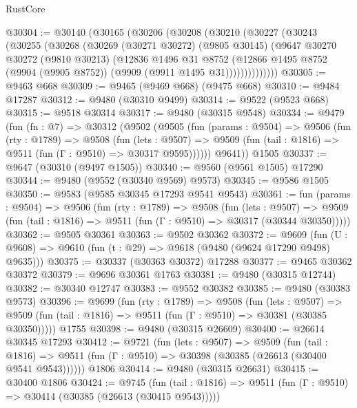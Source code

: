 \begin{lexlean}{RustCore}
\begin{coremodule}
@30304 := @30140
    (@30165
      (@30206
        (@30208
          (@30210
            (@30227
              (@30243
                (@30255
                  (@30268
                    (@30269
                      (@30271 @30272)
                      (@9805 @30145)
                      (@9647
                        @30270
                        @30272
                        (@9810 @30213)
                        (@12836
                          @1496
                          @31
                          @8752
                          (@12866
                            @1495
                            @8752
                            (@9904 (@9905 @8752))
                            (@9909 (@9911 @1495 @31))))))))))))))
@30305 := @9463 @668
@30309 := @9465 (@9469 @668) (@9475 @668)
@30310 := @9484 @17287
@30312 := @9480 (@30310 @9499)
@30314 := @9522 (@9523 @668)
@30315 := @9518 @30314
@30317 := @9480 (@30315 @9548)
@30334 := @9479
    (fun (fn : @7) =>
    @30312
      (@9502
        (@9505
          (fun (params : @9504) =>
          @9506
            (fun (rty : @1789) =>
            @9508
              (fun (lets : @9507) =>
              @9509 (fun (tail : @1816) => @9511 (fun (Γ : @9510) => @30317 @9595))))))
        @9641))
    @1505
@30337 := @9647 (@30310 (@9497 @1505))
@30340 := @9560 (@9561 @1505) @17290
@30344 := @9480 (@9552 (@30340 @9569) @9573)
@30345 := @9586 @1505
@30350 := @9583 (@9585 @30345 @17293 @9541 @9543)
@30361 := fun (params : @9504) =>
  @9506
    (fun (rty : @1789) =>
    @9508
      (fun (lets : @9507) =>
      @9509 (fun (tail : @1816) => @9511 (fun (Γ : @9510) => @30317 (@30344 @30350)))))
@30362 := @9505 @30361
@30363 := @9502 @30362
@30372 := @9609
    (fun (U : @9608) => @9610 (fun (t : @29) => @9618 (@9480 (@9624 @17290 @9498) @9635)))
@30375 := @30337 (@30363 @30372) @17288
@30377 := @9465 @30362 @30372
@30379 := @9696 @30361 @1763
@30381 := @9480 (@30315 @12744)
@30382 := @30340 @12747
@30383 := @9552 @30382
@30385 := @9480 (@30383 @9573)
@30396 := @9699
    (fun (rty : @1789) =>
    @9508
      (fun (lets : @9507) =>
      @9509 (fun (tail : @1816) => @9511 (fun (Γ : @9510) => @30381 (@30385 @30350)))))
    @1755
@30398 := @9480 (@30315 @26609)
@30400 := @26614 @30345 @17293
@30412 := @9721
    (fun (lets : @9507) =>
    @9509
      (fun (tail : @1816) =>
      @9511 (fun (Γ : @9510) => @30398 (@30385 (@26613 (@30400 @9541 @9543))))))
    @1806
@30414 := @9480 (@30315 @26631)
@30415 := @30400 @1806
@30424 := @9745
    (fun (tail : @1816) => @9511 (fun (Γ : @9510) => @30414 (@30385 (@26613 (@30415 @9543)))))

\end{coremodule}
\end{lexlean}

